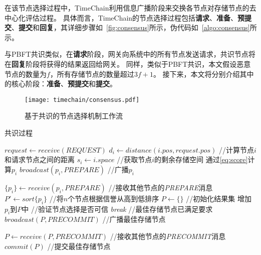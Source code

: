 在该节点选择过程中，TimeChain利用信息广播阶段来交换各节点对存储节点的去中心化评估过程。
具体而言，TimeChain的节点选择过程包括\textbf{请求}、\textbf{准备}、\textbf{预提交}、\textbf{提交}和\textbf{回复}，其详细步骤如~\autoref{fig:consensus}所示，伪代码如~\autoref{algo:consensus}所示。

与PBFT共识类似，在\textbf{请求}阶段，网关向系统中的所有节点发送请求，共识节点将在\textbf{回复}阶段将获得的结果返回给网关。
同样，类似于PBFT共识，本文假设恶意节点的数量为$f$，所有存储节点的数量超过$3f+1$。
接下来，本文将分别介绍其中的核心阶段：\textbf{准备}、\textbf{预提交}和\textbf{提交}。

\begin{figure}[t]
    \centering
    \texttt{[image: timechain/consensus.pdf]}
    \caption{基于共识的节点选择机制工作流}
    \label{fig:consensus}
\end{figure}

\begin{algorithm}
	\caption{共识过程}
	\label{algo:consensus}
	\begin{algorithmic}[1]
        \renewcommand{\algorithmicrequire}{ \textbf{准备阶段}}
        \REQUIRE
            \STATE $request \gets \textit{receive}(REQUEST)$
                \STATE $d_i \gets \textit{distance}(i.pos, request.pos)$ //计算节点$i$和请求节点之间的距离
                \STATE $s_i \gets i.space$ //获取节点$i$的剩余存储空间
                \STATE 通过\autoref{eq:score}计算$p_i$
                \STATE $\textit{broadcast}(p_i, \textit{PREPARE})$  //广播$p_i$
            \ENDIF

        \renewcommand{\algorithmicrequire}{ \textbf{预提交阶段}}
        \REQUIRE
            \STATE $\{p_i\} \gets \textit{receive}(p_i, \textit{PREPARE})$  //接收其他节点的\textit{PREPARE}消息
                \STATE $P' \gets sort \{p_i\}$ //将$n$个节点根据信誉从高到低排序
                \STATE $P \gets \{\}$   //初始化结果集
                        \STATE \textnormal{增加$p_i$到$P$中}    //验证节点选择是否可信
                    \ENDIF
                        \STATE \textit{break}     //最佳存储节点已满足要求
                    \ENDIF
                \ENDFOR
                \STATE $\textit{broadcast}(P, \textit{PRECOMMIT})$  //广播最佳存储节点
            \ENDIF

        \renewcommand{\algorithmicrequire}{ \textbf{提交阶段}}
        \REQUIRE
            \STATE $P \gets \textit{receive}(P, \textit{PRECOMMIT})$    //接收其他节点的\textit{PRECOMMIT}消息
                \STATE $\textit{commit}(P)$ //提交最佳存储节点
            \ENDIF
	\end{algorithmic}
\end{algorithm}

